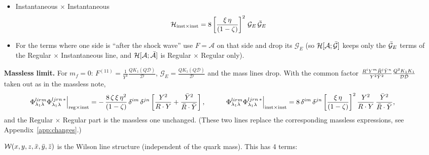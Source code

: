 \documentclass[9pt]{article}
\newcommand{\GE}{\mathcal{G}_{E}}            %
\newcommand{\Hs}{\mathcal{H}}
\numberwithin{equation}{section}
\begin{document}
\begin{itemize}
    \item Instantaneous $\times$ Instantaneous
    \begin{align}
        \Hs_{\text{inst}\times\text{inst}} & =  8\left[\frac{\xi\, \eta}{(1-\zeta)}\right]^{2}\,\GE\,\Bar{\mathcal{G}}_{E}
    \end{align}
    \item For the terms where one side is ``after the shock wave'' use $F=\mathcal{A}$ on that side and drop its $\GE$ (so $\Hs[\mathcal{A};\Bar{\mathcal{G}}]$ keeps only the $\Bar{\mathcal{G}}_{E}$ terms of the Regular $\times$ Instantaneous line, and $\Hs[\mathcal{A};\Bar{\mathcal{A}}]$ is Regular $\times$ Regular only).
\end{itemize}
\textbf{Massless limit.} For $m_{f}=0$: $F^{(11)}=\frac{1}{Y^{2}}\frac{QK_{1}(Q\mathcal{D})}{\mathcal{D}}$, $\GE=\frac{QK_{1}(Q\mathcal{D})}{\mathcal{D}}$ and the mass lines drop. With the common factor $\frac{R^{i}Y^{m}\Bar{R}^{j}\Bar{Y}^{n}}{Y^{2}\Bar{Y}^{2}}\frac{Q^{2}K_{1}K_{1}}{\mathcal{D}\Bar{\mathcal{D}}}$ taken out as in the massless note,
\begin{align}
    \Phi^{lirm}_{\lambda_{1}\lambda}\Phi^{ljrn\,*}_{\lambda_{1}\lambda}\Big|_{\text{reg}\times\text{inst}} & = -\,\frac{8\,\zeta\,\xi\,\eta^{2}}{(1-\zeta)}\,\delta^{im}\,\delta^{jn}\left[\frac{Y^{2}}{R\cdot Y}+\frac{\Bar{Y}^{2}}{\Bar{R}\cdot\Bar{Y}}\right], \hspace{3em}
    \Phi^{lirm}_{\lambda_{1}\lambda}\Phi^{ljrn\,*}_{\lambda_{1}\lambda}\Big|_{\text{inst}\times\text{inst}} = 8\,\delta^{im}\,\delta^{jn}\left[\frac{\xi\,\eta}{(1-\zeta)}\right]^{2}\frac{Y^{2}}{R\cdot Y}\,\frac{\Bar{Y}^{2}}{\Bar{R}\cdot\Bar{Y}},
\end{align}
and the Regular $\times$ Regular part is the massless one unchanged. (These two lines replace the corresponding massless expressions, see Appendix~\ref{app:changes}.)

$\mathcal{W}(x,y,z,\Bar{x},\Bar{y},\Bar{z})$ is the Wilson line structure (independent of the quark mass). This has 4 terms:
\end{document}
